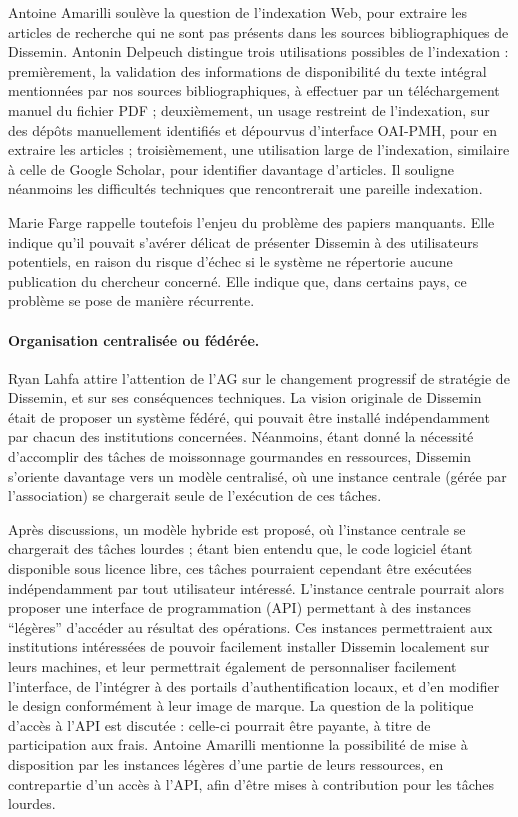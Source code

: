 \documentclass{scrartcl}
\begin{document}
Antoine Amarilli soulève la question de l'indexation Web, pour extraire les
articles de recherche qui ne sont pas présents dans les sources bibliographiques
de Dissemin. Antonin Delpeuch distingue trois utilisations possibles de
l'indexation : premièrement, la validation des informations de disponibilité du
texte intégral mentionnées par nos sources bibliographiques, à effectuer par un
téléchargement manuel du fichier PDF ; deuxièmement,
un usage restreint de l'indexation, sur des dépôts
manuellement identifiés et dépourvus d'interface OAI-PMH, pour en extraire les
articles ; troisièmement, une utilisation large de l'indexation, similaire à
celle de Google Scholar, pour identifier davantage d'articles. Il souligne
néanmoins les difficultés techniques que rencontrerait une pareille indexation.

Marie Farge rappelle toutefois l'enjeu du problème des papiers manquants. Elle
indique qu'il pouvait s'avérer délicat de présenter Dissemin à des utilisateurs
potentiels, en raison du risque d'échec si le système ne répertorie aucune
publication du chercheur concerné. Elle indique que, dans certains pays, ce
problème se pose de manière récurrente.

\paragraph{Organisation centralisée ou fédérée.}
Ryan Lahfa attire l'attention de l'AG sur le changement progressif de
stratégie de Dissemin, et sur ses conséquences techniques. La vision originale
de Dissemin était de proposer un système fédéré, qui pouvait être installé
indépendamment par chacun des institutions concernées. Néanmoins, étant donné la
nécessité d'accomplir des tâches de moissonnage gourmandes en ressources,
Dissemin s'oriente davantage vers un modèle centralisé, où une instance centrale
(gérée par l'association) se chargerait seule de l'exécution de ces tâches. 

Après discussions, un modèle hybride est proposé, où l'instance centrale se
chargerait des tâches lourdes ; étant bien entendu que, le code logiciel étant
disponible sous licence libre, ces tâches pourraient cependant être exécutées
indépendamment par tout utilisateur intéressé. L'instance centrale pourrait alors
proposer une interface de programmation (API) permettant à des instances
``légères'' d'accéder au résultat des opérations. Ces instances permettraient
aux institutions intéressées de pouvoir facilement installer Dissemin localement
sur leurs machines, et leur permettrait également de personnaliser facilement
l'interface, de l'intégrer à des portails d'authentification locaux, et d'en
modifier le design conformément à leur image de marque. La question de la
politique d'accès à l'API est discutée : celle-ci pourrait être payante, à titre
de participation aux frais. Antoine Amarilli mentionne la possibilité de mise à
disposition par les instances légères d'une partie de leurs ressources, en
contrepartie d'un accès à l'API, afin d'être mises à contribution pour les
tâches lourdes.
\end{document}
